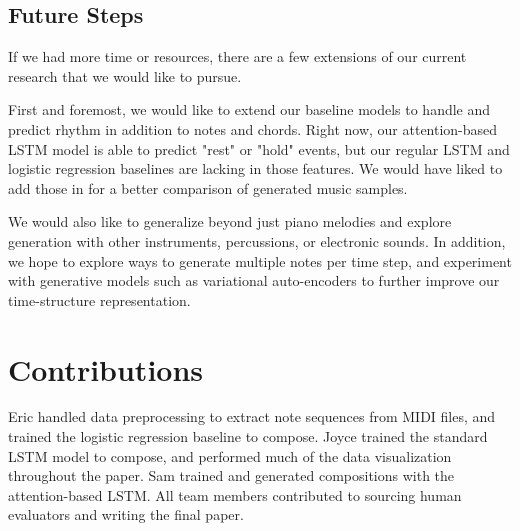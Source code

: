 \documentclass[twoside,twocolumn]{article}
\begin{document}
\subsection{Future Steps}
If we had more time or resources, there are a few extensions of our current research that we would like to pursue.

First and foremost, we would like to extend our baseline models to handle and predict rhythm in addition to notes and chords. Right now, our attention-based LSTM model is able to predict "rest" or "hold" events, but our regular LSTM and logistic regression baselines are lacking in those features. We would have liked to add those in for a better comparison of generated music samples.

We would also like to generalize beyond just piano melodies and explore generation with
other instruments, percussions, or electronic sounds. In addition, we hope to
explore ways to generate multiple notes per time step, and experiment with generative models such as variational auto-encoders to further improve our time-structure
representation.


\section{Contributions}

Eric handled data preprocessing to extract note sequences from MIDI files, and trained the logistic regression baseline to compose. Joyce trained the standard LSTM model to compose, and performed much of the data visualization throughout the paper. Sam trained and generated compositions with the attention-based LSTM. All team members contributed to sourcing human evaluators and writing the final paper.






\end{document}

